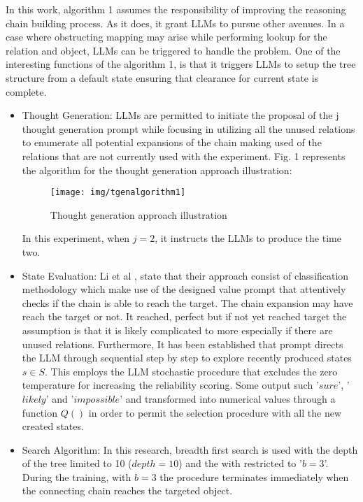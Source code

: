 \documentclass{article}
\begin{document}
In this work, algorithm 1 assumes the responsibility of improving the reasoning chain building process. As it does, it grant LLMs to pursue other avenues. In a case where obstructing mapping may arise while performing lookup for the relation and object, LLMs can be triggered to handle the problem. One of the interesting functions of the algorithm 1, is that it triggers LLMs to setup the tree structure from a default state ensuring that clearance for current state is complete. 
\begin{itemize}
    \item Thought Generation:
    LLMs are permitted to initiate the proposal of the j thought generation prompt while focusing in utilizing all the unused relations to enumerate all potential expansions of the chain making used of the relations that are not currently used with the experiment. Fig. 1 represents the algorithm for the thought generation approach illustration:

\begin{figure}[!ht]
    \centering
    \texttt{[image: img/tgenalgorithm1]}
    \caption{Thought generation approach illustration}
    \label{fig:Thought generation}
\end{figure}

In this experiment, when $j=2$, it instructs the LLMs to produce the time two.
    
    \item State Evaluation: Li et al \cite{li2024}, state that their approach consist of classification methodology which make use of the designed value prompt that attentively checks if the chain is able to reach the target. The chain expansion may have reach the target or not. It reached, perfect but if not yet reached target the assumption is that it is likely complicated to more especially if there are unused relations. Furthermore, It has been established that prompt directs the LLM through sequential step by step to explore recently produced states $s \in S$. This employs the LLM stochastic procedure that excludes the zero temperature for increasing the reliability scoring. Some output such '$sure$', '$likely$' and '$impossible$' and transformed into numerical values through a function $Q()$ in order to permit the selection procedure with all the new created states.

    \item Search Algorithm: In this research, breadth first search is used with the depth of the tree limited to 10 ($depth = 10$) and the with restricted to '$b = 3$'. During the training, with $b = 3$ the procedure terminates immediately when the connecting chain reaches the targeted object. 
\end{itemize}
\end{document}
